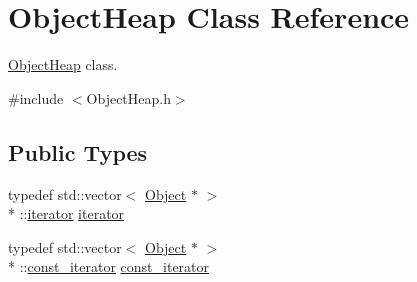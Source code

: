 \hypertarget{classObjectHeap}{\section{Object\-Heap Class Reference}
\label{classObjectHeap}
}


\hyperlink{classObjectHeap}{Object\-Heap} class.  




{\ttfamily \#include $<$Object\-Heap.\-h$>$}

\subsection*{Public Types}
\begin{DoxyCompactItemize}
\item 
typedef std\-::vector$<$ \hyperlink{classObject}{Object} $\ast$ $>$\\*
\-::\hyperlink{classObjectHeap_a5be9fee885fae47d7dc090899d9fb7bd}{iterator} \hyperlink{classObjectHeap_a5be9fee885fae47d7dc090899d9fb7bd}{iterator}
\item 
typedef std\-::vector$<$ \hyperlink{classObject}{Object} $\ast$ $>$\\*
\-::\hyperlink{classObjectHeap_af07744bc1ca895917429540266b2b9bd}{const\-\_\-iterator} \hyperlink{classObjectHeap_af07744bc1ca895917429540266b2b9bd}{const\-\_\-iterator}
\end{DoxyCompactItemize}
